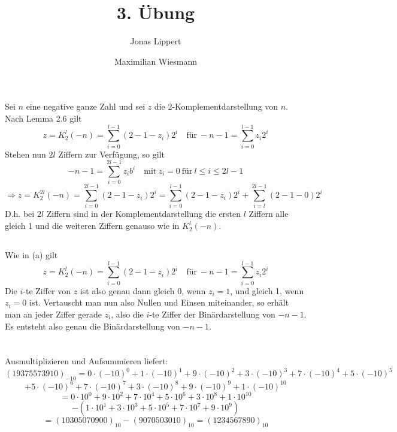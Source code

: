 \documentclass[11pt]{scrartcl}
\title{3. Übung}
\author{Jonas Lippert \and Maximilian Wiesmann}
\theoremstyle{dotless}
\begin{document}
	\maketitle
	\section{}
	\subsection{}
	\section{}
	\subsection{}
		Sei $n$ eine negative ganze Zahl und sei $z$ die 2-Komplementdarstellung von $n$. Nach Lemma 2.6 gilt
		$$ z = K_2^l(-n) = \sum_{i=0}^{l-1}(2-1-z_i)2^i \quad\text{für}~-n-1=\sum_{i=0}^{l-1}z_i2^i $$ 
		Stehen nun $2l$ Ziffern zur Verfügung, so gilt
		$$-n-1=\sum_{i=0}^{2l-1}z_ib^i\quad \text{mit}~z_i=0~\text{für}~l\le i\le 2l-1$$
		$$\Rightarrow z = K_2^{2l}(-n) = \sum_{i=0}^{2l-1}(2-1-z_i)2^i = \sum_{i=0}^{l-1}(2-1-z_i)2^i + \sum_{i=l}^{2l-1}(2-1-0)2^i$$
		D.h. bei $2l$ Ziffern sind in der Komplementdarstellung die ersten $l$ Ziffern alle gleich 1 und die weiteren Ziffern genauso wie in $K_2^{l}(-n)$.
	\subsection{}
		Wie in (a) gilt
		$$ z = K_2^l(-n) = \sum_{i=0}^{l-1}(2-1-z_i)2^i \quad\text{für}~-n-1=\sum_{i=0}^{l-1}z_i2^i $$ 
		Die $i$-te Ziffer von $z$ ist also genau dann gleich 0, wenn $z_i=1$, und gleich 1, wenn $z_i=0$ ist. Vertauscht man nun also Nullen und Einsen miteinander, so erhält man an jeder Ziffer gerade $z_i$, also die $i$-te Ziffer der Binärdarstellung von $-n-1$. Es entsteht also genau die Binärdarstellung von $-n-1$.
	\section{}
	\subsection{}
		Ausmultiplizieren und Aufsummieren liefert:
		$$(19375573910)_{-10}=0\cdot (-10)^0+1\cdot (-10)^1+9\cdot (-10)^2 + 3\cdot (-10)^3+7\cdot (-10)^4+5\cdot(-10)^5$$$$+5\cdot (-10)^6+7\cdot (-10)^7+3\cdot (-10)^8+9\cdot (-10)^9 +1\cdot(-10)^{10}$$
		$$=0\cdot 10^0+9\cdot 10^2+7\cdot 10^4+5\cdot 10^6+3\cdot 10^8 +1\cdot10^{10}$$
		$$-(1\cdot 10^1+3\cdot 10^3+5\cdot 10^5+7\cdot 10^7+9\cdot 10^9)$$
		$$=(10305070900)_{10}-(9070503010)_{10}=(1234567890)_{10}$$
\end{document}

